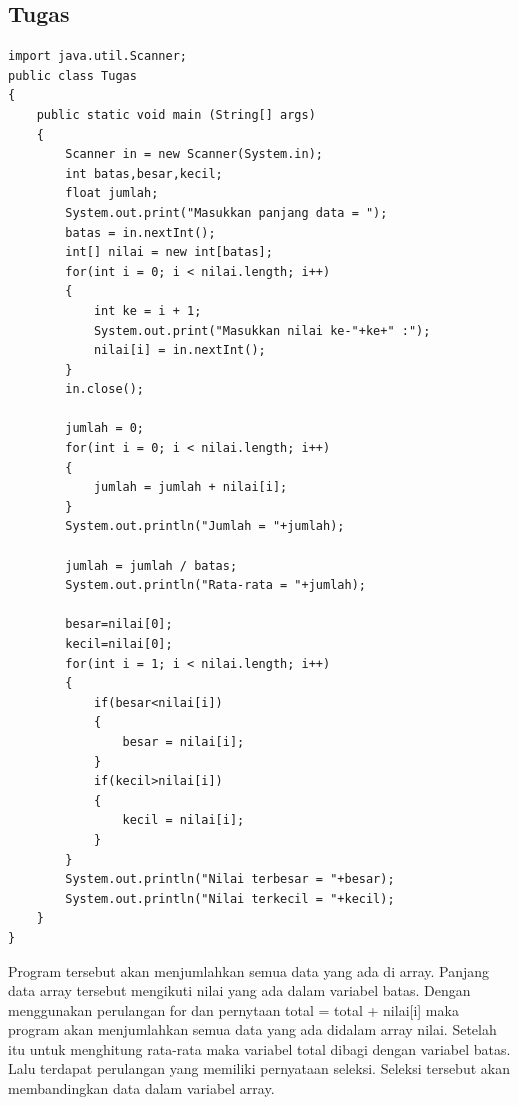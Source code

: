 \documentclass[a4paper,12pt]{article}
\begin{document}
\subsection{Tugas}
\begin{lstlisting}
import java.util.Scanner;
public class Tugas
{
    public static void main (String[] args) 
    {
        Scanner in = new Scanner(System.in);
        int batas,besar,kecil;
        float jumlah;
        System.out.print("Masukkan panjang data = ");
        batas = in.nextInt();
        int[] nilai = new int[batas];
        for(int i = 0; i < nilai.length; i++)
        {
            int ke = i + 1;
            System.out.print("Masukkan nilai ke-"+ke+" :");
            nilai[i] = in.nextInt();
        }
        in.close();

        jumlah = 0;
        for(int i = 0; i < nilai.length; i++)
        {
            jumlah = jumlah + nilai[i];
        }
        System.out.println("Jumlah = "+jumlah);

        jumlah = jumlah / batas;
        System.out.println("Rata-rata = "+jumlah);

        besar=nilai[0];
        kecil=nilai[0];
        for(int i = 1; i < nilai.length; i++)
        {
            if(besar<nilai[i])
            {
                besar = nilai[i];
            }
            if(kecil>nilai[i])
            {
                kecil = nilai[i];
            }
        }
        System.out.println("Nilai terbesar = "+besar);
        System.out.println("Nilai terkecil = "+kecil);
    }
}
\end{lstlisting}
Program tersebut akan menjumlahkan semua data yang ada di array. Panjang data array tersebut mengikuti nilai yang ada dalam variabel batas. Dengan menggunakan perulangan for dan pernytaan total = total + nilai[i] maka program akan menjumlahkan semua data yang ada 
didalam array nilai. Setelah itu untuk menghitung rata-rata maka variabel total dibagi dengan variabel batas. Lalu terdapat perulangan yang memiliki pernyataan seleksi. Seleksi tersebut akan membandingkan data dalam variabel array. 
\end{document}
